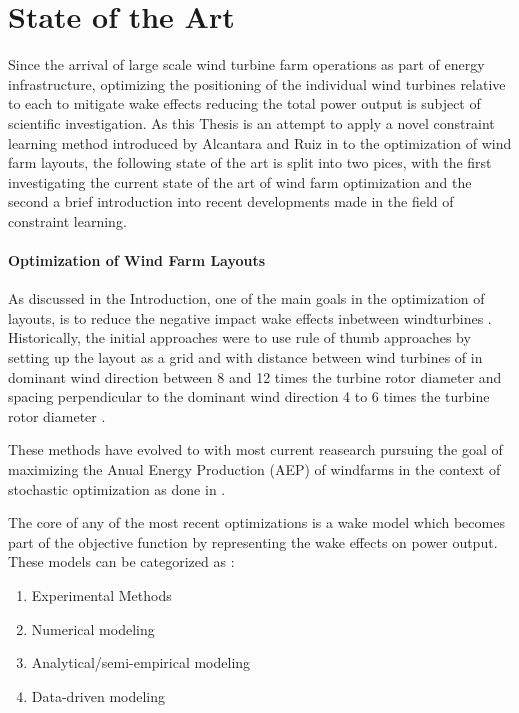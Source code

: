 
\chapter{State of the Art}\label{chapter:state_of_the_art}

Since the arrival of large scale wind turbine farm operations as part of energy infrastructure, optimizing the positioning of the individual wind turbines relative to each to mitigate wake effects reducing the total power output is subject of scientific investigation. As this Thesis is an attempt to apply a novel constraint learning method introduced by Alcantara and Ruiz in \cite{ALCANTARA2023120895} to the optimization of wind farm layouts, the following state of the art is split into two pices, with the first investigating the current state of the art of wind farm optimization and the second a brief introduction into recent developments made in the field of constraint learning. 

\subsubsection{Optimization of Wind Farm Layouts}

As discussed in the Introduction, one of the main goals in the optimization of layouts, is to reduce the negative impact wake effects inbetween windturbines \cite{KIM2024123383}. Historically, the initial approaches were to use rule of thumb approaches by setting up the layout as a grid and with distance between wind turbines of in dominant wind direction  between 8 and 12 times the turbine rotor diameter and spacing perpendicular to the dominant wind direction 4 to 6 times the turbine rotor diameter \cite{AZLAN2021110047} \cite{hou_review_2019}.

These methods have evolved to with most current reasearch pursuing the goal of maximizing the Anual Energy Production (AEP) of windfarms in the context of stochastic optimization as done in \cite{Sinner_2024} \cite{KIM2024123383}. 

The core of any of the most recent optimizations is a wake model which becomes part of the objective function by representing the wake effects on power output. These models can be categorized as \cite{WANG2024118508}: 

\begin{enumerate}
	\item Experimental Methods
	\item Numerical modeling
	\item Analytical/semi-empirical modeling
	\item Data-driven modeling
\end{enumerate}

